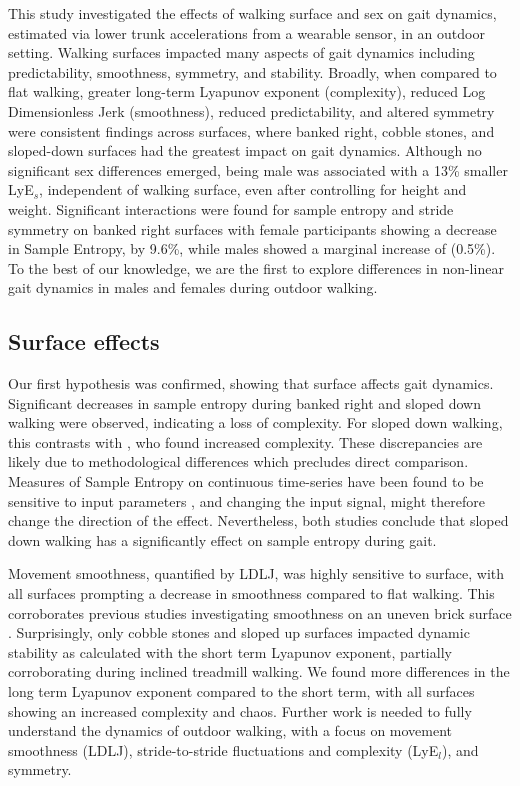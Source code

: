 \documentclass[authoryear,preprint,review,12pt]{elsarticle}
\begin{document}
This study investigated the effects of walking surface and sex on gait dynamics, estimated via lower trunk accelerations from a wearable sensor, in an outdoor setting. Walking surfaces impacted many aspects of gait dynamics including predictability, smoothness, symmetry, and stability. Broadly, when compared to flat walking, greater long-term Lyapunov exponent (complexity), reduced Log Dimensionless Jerk (smoothness), reduced predictability, and altered symmetry were consistent findings across surfaces, where banked right, cobble stones, and sloped-down surfaces had the greatest impact on gait dynamics. Although no significant sex differences emerged, being male was associated with a 13\% smaller LyE${_s}$, independent of walking surface, even after controlling for height and weight. Significant interactions were found for sample entropy and stride symmetry on banked right surfaces with female participants showing a decrease in Sample Entropy, by 9.6\%, while males showed a marginal increase of (0.5\%). To the best of our knowledge, we are  the first to explore differences in non-linear gait dynamics in males and females during outdoor walking. 

\subsection{Surface effects}
Our first hypothesis was confirmed, showing that surface affects gait dynamics. Significant decreases in sample entropy during banked right and sloped down walking were observed, indicating a loss of complexity. For sloped down walking, this contrasts with \cite{vieira_gait_2017}, who found increased complexity. These discrepancies are likely due to methodological differences which precludes direct comparison. Measures of Sample Entropy on continuous time-series have been found to be sensitive to input parameters \citep{mccamley2018calculation}, and changing the input signal, might therefore change the direction of the effect. Nevertheless, both studies conclude that sloped down walking has a significantly effect on sample entropy during gait.

Movement smoothness, quantified by LDLJ, was highly sensitive to surface, with all surfaces prompting a decrease in smoothness compared to flat walking. This corroborates previous studies investigating smoothness on an uneven brick surface \citep{dixon_late-cueing_2018}. 
Surprisingly, only cobble stones and sloped up surfaces impacted dynamic stability as calculated with the short term Lyapunov exponent, partially corroborating \cite{vieira_gait_2017} during inclined treadmill walking.
We found more differences in the long term Lyapunov exponent compared to the short term, with all surfaces showing an increased complexity and chaos. Further work is needed to fully understand the dynamics of outdoor walking, with a focus on movement smoothness (LDLJ), stride-to-stride fluctuations and complexity (LyE$_{l}$), and symmetry. 
\end{document}
